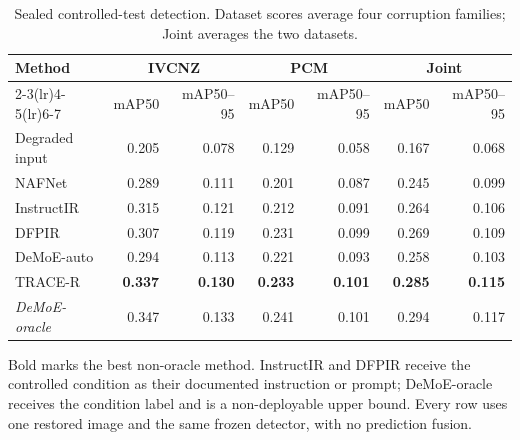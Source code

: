 \begin{table}[!t]
\centering
\caption{Sealed controlled-test detection. Dataset scores average four corruption families; Joint averages the two datasets.}
\label{tab:controlled_summary}
\scriptsize
\begin{tabular}{lrrrrrr}
\toprule
Method & \multicolumn{2}{c}{IVCNZ} & \multicolumn{2}{c}{PCM} & \multicolumn{2}{c}{Joint} \\
\cmidrule(lr){2-3}\cmidrule(lr){4-5}\cmidrule(lr){6-7}
 & mAP50 & mAP50--95 & mAP50 & mAP50--95 & mAP50 & mAP50--95 \\
\midrule
Degraded input & 0.205 & 0.078 & 0.129 & 0.058 & 0.167 & 0.068 \\
NAFNet & 0.289 & 0.111 & 0.201 & 0.087 & 0.245 & 0.099 \\
InstructIR & 0.315 & 0.121 & 0.212 & 0.091 & 0.264 & 0.106 \\
DFPIR & 0.307 & 0.119 & 0.231 & 0.099 & 0.269 & 0.109 \\
DeMoE-auto & 0.294 & 0.113 & 0.221 & 0.093 & 0.258 & 0.103 \\
TRACE-R & \textbf{0.337} & \textbf{0.130} & \textbf{0.233} & \textbf{0.101} & \textbf{0.285} & \textbf{0.115} \\
\emph{DeMoE-oracle} & 0.347 & 0.133 & 0.241 & 0.101 & 0.294 & 0.117 \\
\bottomrule
\end{tabular}
\vspace{1mm}
\parbox{0.97\textwidth}{\scriptsize Bold marks the best non-oracle method. InstructIR and DFPIR receive the controlled condition as their documented instruction or prompt; DeMoE-oracle receives the condition label and is a non-deployable upper bound. Every row uses one restored image and the same frozen detector, with no prediction fusion.}
\end{table}
